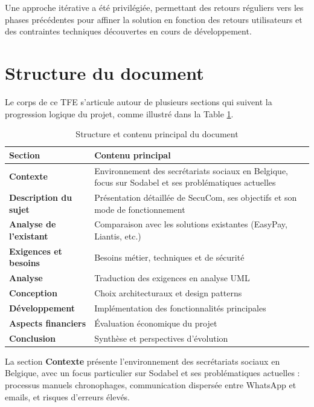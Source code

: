 \begin{note}
Une approche itérative a été privilégiée, permettant des retours réguliers vers les phases précédentes pour affiner la solution en fonction des retours utilisateurs et des contraintes techniques découvertes en cours de développement.
\end{note}

\section{Structure du document}

Le corps de ce TFE s'articule autour de plusieurs sections qui suivent la progression logique du projet, comme illustré dans la Table \ref{tab:structure}.

\begin{table}[h]
\centering
\begin{tabular}{|p{4cm}|p{8cm}|}
\hline
\rowcolor{primarycolor!20}
\textbf{Section} & \textbf{Contenu principal} \\
\hline
\textbf{Contexte} & Environnement des secrétariats sociaux en Belgique, focus sur Sodabel et ses problématiques actuelles \\
\hline
\textbf{Description du sujet} & Présentation détaillée de SecuCom, ses objectifs et son mode de fonctionnement \\
\hline
\textbf{Analyse de l'existant} & Comparaison avec les solutions existantes (EasyPay, Liantis, etc.) \\
\hline
\textbf{Exigences et besoins} & Besoins métier, techniques et de sécurité \\
\hline
\textbf{Analyse} & Traduction des exigences en analyse UML \\
\hline
\textbf{Conception} & Choix architecturaux et design patterns \\
\hline
\textbf{Développement} & Implémentation des fonctionnalités principales \\
\hline
\textbf{Aspects financiers} & Évaluation économique du projet \\
\hline
\textbf{Conclusion} & Synthèse et perspectives d'évolution \\
\hline
\end{tabular}
\caption{Structure et contenu principal du document}
\label{tab:structure}
\end{table}

La section \textbf{Contexte} présente l'environnement des secrétariats sociaux en Belgique, avec un focus particulier sur Sodabel et ses problématiques actuelles : processus manuels chronophages, communication dispersée entre WhatsApp et emails, et risques d'erreurs élevés.

